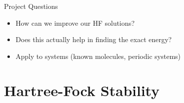 \documentclass[10pt]{beamer}
\begin{document}
{{\begin{frame}{Project Questions}
	\begin{itemize}[<+->]
		\item {How can we improve our HF solutions?}
		\item {Does this actually help in finding the exact energy?}
		\item {Apply to systems (known molecules, periodic systems)}
	\end{itemize}
\end{frame}


\section{Hartree-Fock Stability}

}}
\end{document}
